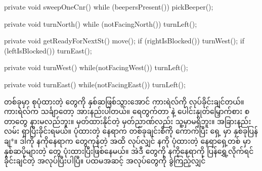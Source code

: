 \begin{sloppypar}
\begin{lstcodelong}[{\mycodelstcpt{SweepTheStreets}}, label={lst:SweepTheStreets}]
{        private void sweepOneCnr() {
                while (beepersPresent()) {
                        pickBeeper();
                }
        }

        private void turnNorth() {
                while (notFacingNorth()) {
                        turnLeft();
                }
        }

        private void getReadyForNextSt() {
                move();
                if (rightIsBlocked()) {
                        turnWest();
                }
                if (leftIsBlocked()) {
                        turnEast();
                }
        }

        private void turnWest() {
                while(notFacingWest()) {
                        turnLeft();
                }
        }

        private void turnEast() {
                while(notFacingEast()) {
                        turnLeft();
                }
        }
}
\end{lstcodelong}

\mmcorner တစ်ခုမှာ စုပုံထားတဲ့ \mmbeeper တွေကို နှစ်ဆဖြစ်သွားအောင် ကားရဲလ်ကို လုပ်ခိုင်းချင်တယ်။ ကားရဲလ်က သင်္ချာတော့ အားနည်းပါတယ်။ ရေတွက်တာ  နဲ့ ပေါင်းနှုတ်မြှောက်စား စတာတွေ နားမလည်ဘူး။ မှတ်ထားနိုင်တဲ့ မှတ်ညာဏ်လည်း သူ့မှာမရှိဘူး။ အခြားနည်းလမ်း ရှာပြီးခိုင်းရမယ်။ ပုံထားတဲ့ နေရာက \mmbeeper တစ်ခုချင်းစီကို ကောက်ပြီး ရှေ့ \mmcorner မှာ နှစ်ခုပြန်ချ*။ ဒါကို နကိုနေရာက  \mmbeeper တွေကုန်တဲ့ အထိ လုပ်လျှင် နကို ပုံထားတဲ့ နေရာရှေ့တစ် \mmcorner မှာ နှစ်ဆပိုများတဲ့ \mmbeeper တွေ ပုံးထားပြီးဖြစ်နေမယ်။ အဲဒီ \mmbeeper တွေကို နကိုနေရာကို ပြန်ရွှေ့လိုက်ရင် ခိုင်းချင်တဲ့ အလုပ်ပြီးပါပြီ။ ပထမအဆင့် အလုပ်တွေကို ခွဲကြည့်လျှင်


\end{sloppypar}
